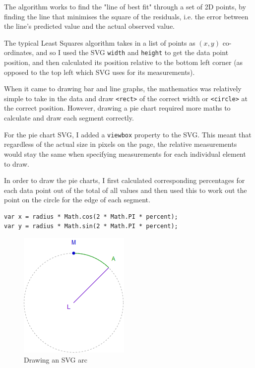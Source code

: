 \documentclass[ %
                    author={Aleena Baig},
                supervisor={Dr Simon Lock},
                    degree={BSc},
                     title={On Making Web Accessible Graphs},
                  subtitle={},
                      year={2019} ]{dissertation}
\begin{document}
The algorithm works to find the "line of best fit" through a set of 2D points, by finding the line that minimises the square of the residuals, i.e. the error between the line's predicted value and the actual observed value.

The typical Least Squares algorithm takes in a list of points as $(x,y)$ co-ordinates, and so I used the SVG \texttt{width} and \texttt{height} to get the data point position, and then calculated its position relative to the bottom left corner (as opposed to the top left which SVG uses for its measurements).

When it came to drawing bar and line graphs, the mathematics was relatively simple to take in the data and draw \texttt{<rect>} of the correct width or \texttt{<circle>} at the correct position. However, drawing a pie chart required more maths to calculate and draw each segment correctly.

For the pie chart SVG, I added a \texttt{viewbox} property to the SVG. This meant that regardless of the actual size in pixels on the page, the relative measurements would stay the same when specifying measurements for each individual element to draw.

In order to draw the pie charts, I first calculated corresponding percentages for each data point out of the total of all values and then used this to work out the point on the circle for the edge of each segment.

\begin{lstlisting}
var x = radius * Math.cos(2 * Math.PI * percent);
var y = radius * Math.sin(2 * Math.PI * percent);
\end{lstlisting}

\begin{figure}
\includegraphics[width=0.9\linewidth]{images/DrawingArc.png} 
\caption{Drawing an SVG arc}
\end{figure}
\end{document}
